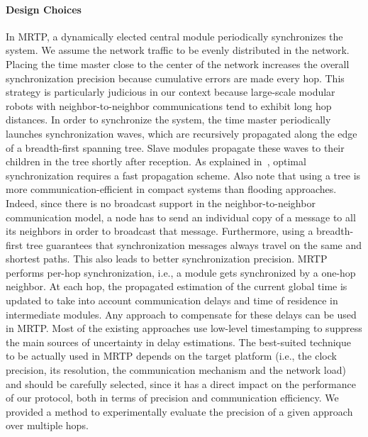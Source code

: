 \paragraph{Design Choices}
In MRTP, a dynamically elected central module periodically synchronizes the system. We assume the network traffic to be evenly distributed in the network. Placing the time master close to the center of the network increases the overall synchronization precision because cumulative errors are made every hop. This strategy is particularly judicious in our context because large-scale modular robots with neighbor-to-neighbor communications tend to exhibit long hop distances. In order to synchronize the system, the time master periodically launches synchronization waves, which are recursively propagated along the edge of a breadth-first spanning tree. Slave modules propagate these waves to their children in the tree shortly after reception. As explained in~\cite{lenzen2009optimal}, optimal synchronization requires a fast propagation scheme. Also note that using a tree is more communication-efficient in compact systems than flooding approaches. Indeed, since there is no broadcast support in the neighbor-to-neighbor communication model, a node has to send an individual copy of a message to all its neighbors in order to broadcast that message. Furthermore, using a breadth-first tree guarantees that synchronization messages always travel on the same and shortest paths. This also leads to better synchronization precision. MRTP performs per-hop synchronization, i.e., a module gets synchronized by a one-hop neighbor. At each hop, the propagated estimation of the current global time is updated to take into account communication delays and time of residence in intermediate modules. Any approach to compensate for these delays can be used in MRTP. Most of the existing approaches use low-level timestamping to suppress the main sources of uncertainty in delay estimations. The best-suited technique to be actually used in MRTP depends on the target platform (i.e., the clock precision, its resolution, the communication mechanism and the network load) and should be carefully selected, since it has a direct impact on the performance of our protocol, both in terms of precision and communication efficiency. We provided a method to experimentally evaluate the precision of a given approach over multiple hops.

